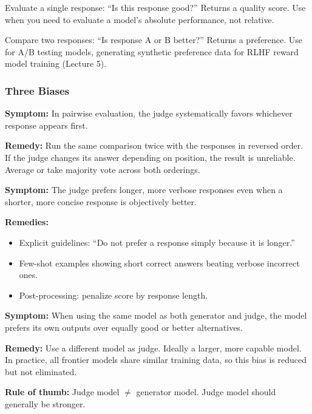 \documentclass[11pt, a4paper]{article}
\begin{document}
\begin{defbox}
Evaluate a single response: ``Is this response good?'' Returns a quality score. Use when you need to evaluate a model's absolute performance, not relative.
\end{defbox}

\begin{defbox}
Compare two responses: ``Is response A or B better?'' Returns a preference. Use for A/B testing models, generating synthetic preference data for RLHF reward model training (Lecture 5).
\end{defbox}

\subsubsection{Three Biases}

\begin{warnbox}
\textbf{Symptom:} In pairwise evaluation, the judge systematically favors whichever response appears first.

\textbf{Remedy:} Run the same comparison twice with the responses in reversed order. If the judge changes its answer depending on position, the result is unreliable. Average or take majority vote across both orderings.
\end{warnbox}

\begin{warnbox}
\textbf{Symptom:} The judge prefers longer, more verbose responses even when a shorter, more concise response is objectively better.

\textbf{Remedies:}
\begin{itemize}[leftmargin=1.5em]
  \item Explicit guidelines: ``Do not prefer a response simply because it is longer.''
  \item Few-shot examples showing short correct answers beating verbose incorrect ones.
  \item Post-processing: penalize score by response length.
\end{itemize}
\end{warnbox}

\begin{warnbox}
\textbf{Symptom:} When using the same model as both generator and judge, the model prefers its own outputs over equally good or better alternatives.

\textbf{Remedy:} Use a different model as judge. Ideally a larger, more capable model. In practice, all frontier models share similar training data, so this bias is reduced but not eliminated.

\textbf{Rule of thumb:} Judge model $\neq$ generator model. Judge model should generally be stronger.
\end{warnbox}
\end{document}
